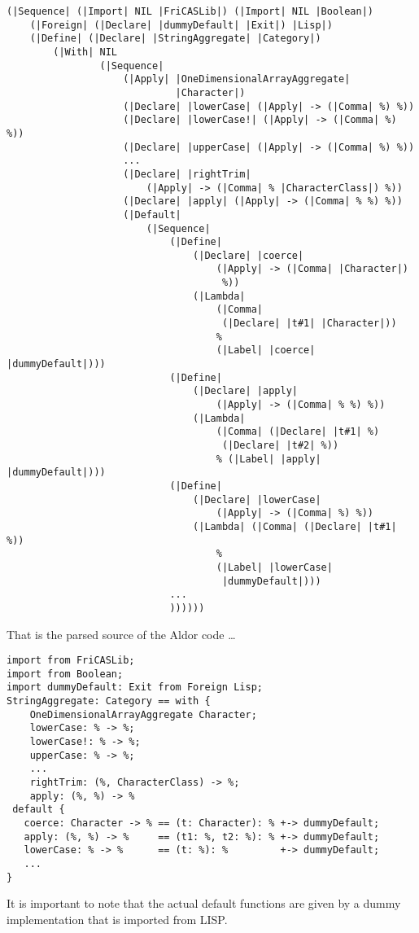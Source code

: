 \documentclass{article}
\begin{document}
\begin{verbatim}
(|Sequence| (|Import| NIL |FriCASLib|) (|Import| NIL |Boolean|)
    (|Foreign| (|Declare| |dummyDefault| |Exit|) |Lisp|)
    (|Define| (|Declare| |StringAggregate| |Category|)
        (|With| NIL
                (|Sequence|
                    (|Apply| |OneDimensionalArrayAggregate|
                             |Character|)
                    (|Declare| |lowerCase| (|Apply| -> (|Comma| %) %))
                    (|Declare| |lowerCase!| (|Apply| -> (|Comma| %) %))
                    (|Declare| |upperCase| (|Apply| -> (|Comma| %) %))
                    ...
                    (|Declare| |rightTrim|
                        (|Apply| -> (|Comma| % |CharacterClass|) %))
                    (|Declare| |apply| (|Apply| -> (|Comma| % %) %))
                    (|Default|
                        (|Sequence|
                            (|Define|
                                (|Declare| |coerce|
                                    (|Apply| -> (|Comma| |Character|)
                                     %))
                                (|Lambda|
                                    (|Comma|
                                     (|Declare| |t#1| |Character|))
                                    %
                                    (|Label| |coerce| |dummyDefault|)))
                            (|Define|
                                (|Declare| |apply|
                                    (|Apply| -> (|Comma| % %) %))
                                (|Lambda|
                                    (|Comma| (|Declare| |t#1| %)
                                     (|Declare| |t#2| %))
                                    % (|Label| |apply| |dummyDefault|)))
                            (|Define|
                                (|Declare| |lowerCase|
                                    (|Apply| -> (|Comma| %) %))
                                (|Lambda| (|Comma| (|Declare| |t#1| %))
                                    %
                                    (|Label| |lowerCase|
                                     |dummyDefault|)))
                            ...
                            ))))))
\end{verbatim}
That is the parsed source of the Aldor code \ldots
\begin{verbatim}
import from FriCASLib;
import from Boolean;
import dummyDefault: Exit from Foreign Lisp;
StringAggregate: Category == with {
    OneDimensionalArrayAggregate Character;
    lowerCase: % -> %;
    lowerCase!: % -> %;
    upperCase: % -> %;
    ...
    rightTrim: (%, CharacterClass) -> %;
    apply: (%, %) -> %
 default {
   coerce: Character -> % == (t: Character): % +-> dummyDefault;
   apply: (%, %) -> %     == (t1: %, t2: %): % +-> dummyDefault;
   lowerCase: % -> %      == (t: %): %         +-> dummyDefault;
   ...
}
\end{verbatim}
It is important to note that the actual default functions are given by
a dummy implementation that is imported from LISP.
\end{document}

